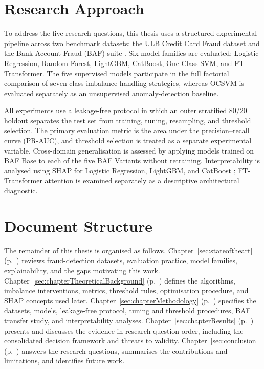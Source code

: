 \section{Research Approach}
\label{subsec:workflow}

To address the five research questions, this thesis uses a structured experimental pipeline across two benchmark datasets: the ULB Credit Card Fraud dataset \cite{dalpozzolo2017realistic,ulb2013dataset} and the Bank Account Fraud (BAF) suite \cite{jesus2022turning,feedzai2022bafdataset}. Six model families are evaluated: Logistic Regression, Random Forest, LightGBM, CatBoost, One-Class SVM, and FT-Transformer. The five supervised models participate in the full factorial comparison of seven class imbalance handling strategies, whereas OCSVM is evaluated separately as an unsupervised anomaly-detection baseline.

All experiments use a leakage-free protocol in which an outer stratified 80/20 holdout separates the test set from training, tuning, resampling, and threshold selection. The primary evaluation metric is the area under the precision--recall curve (PR-AUC), and threshold selection is treated as a separate experimental variable. Cross-domain generalisation is assessed by applying models trained on BAF Base to each of the five BAF Variants without retraining. Interpretability is analysed using SHAP for Logistic Regression, LightGBM, and CatBoost \cite{lundberg2017unified}; FT-Transformer attention is examined separately as a descriptive architectural diagnostic.

\section{Document Structure}
\label{subsec:structure}

The remainder of this thesis is organised as follows. Chapter~\ref{sec:stateoftheart} (p.~\pageref{sec:stateoftheart}) reviews fraud-detection datasets, evaluation practice, model families, explainability, and the gaps motivating this work. Chapter~\ref{sec:chapterTheoreticalBackground} (p.~\pageref{sec:chapterTheoreticalBackground}) defines the algorithms, imbalance interventions, metrics, threshold rules, optimisation procedure, and SHAP concepts used later. Chapter~\ref{sec:chapterMethodology} (p.~\pageref{sec:chapterMethodology}) specifies the datasets, models, leakage-free protocol, tuning and threshold procedures, BAF transfer study, and interpretability analyses. Chapter~\ref{sec:chapterResults} (p.~\pageref{sec:chapterResults}) presents and discusses the evidence in research-question order, including the consolidated decision framework and threats to validity. Chapter~\ref{sec:conclusion} (p.~\pageref{sec:conclusion}) answers the research questions, summarises the contributions and limitations, and identifies future work.
